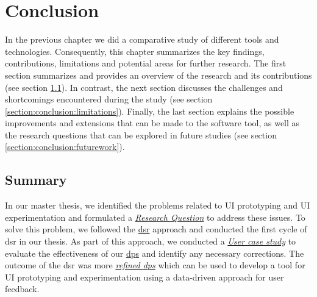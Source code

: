 
\chapter{Conclusion}
\label{chap:conclusion}
In the previous chapter we did a comparative study of different tools and technologies. 
Consequently, this chapter summarizes the key findings, contributions, limitations and potential areas for further research. 
The first section summarizes and provides an overview of the research and its contributions (see section \ref{section:conclusion:summary}). 
In contrast, the next section discusses the challenges and shortcomings encountered during the study (see section \ref{section:conclusion:limitations}). 
Finally, the last section explains the possible improvements and extensions that can be made to the software tool, as well as the research questions that can be explored in future studies (see section \ref{section:conclusion:futurework}).

\ifpdf
    \graphicspath{{Chapters/Conclusion/Figs/}{Chapters/Conclusion/Figs/}{Chapters/Conclusion/Figs/}}
\else
    \graphicspath{{Chapters/Conclusion/Figs/}{Chapters/Conclusion/Figs/}}
\fi

\section{Summary}
\label{section:conclusion:summary}
In our master thesis, we identified the problems related to UI prototyping and UI experimentation and formulated a \textit{\hyperref[introduction:section:research]{Research Question}} to address these issues. 
To solve this problem, we followed the \hyperref[introduction:section:research]{\ac{dsr}} approach and conducted the first cycle of \ac{dsr} in our thesis.
As part of this approach, we conducted a \textit{\hyperref[evaluation:section:casestudy]{User case study}} to evaluate the effectiveness of our \hyperref[design:section:designprinciple]{\ac{dp}s} and identify any necessary corrections. 
The outcome of the \ac{dsr} was more \textit{\hyperref[evaluation:section:interpretation]{refined \ac{dp}s}} which can be used to develop a tool for UI prototyping and experimentation using a data-driven approach for user feedback.

